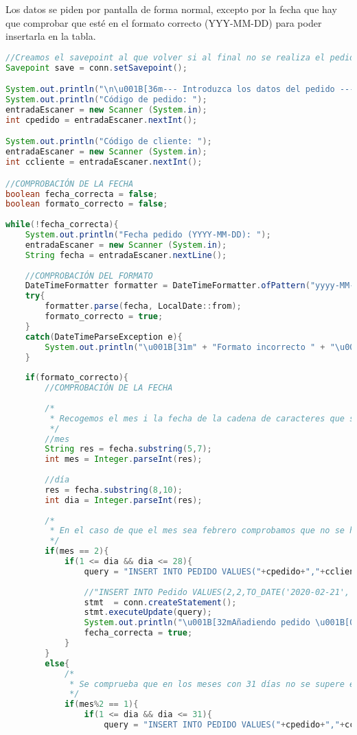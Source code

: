 Los datos se piden por pantalla de forma normal, excepto por la fecha que hay que comprobar que esté en el formato correcto (YYY-MM-DD) para poder insertarla en la tabla.

\begin{lstlisting}[language=Java]
//Creamos el savepoint al que volver si al final no se realiza el pedido
Savepoint save = conn.setSavepoint();

System.out.println("\n\u001B[36m--- Introduzca los datos del pedido ---\u001B[0m");
System.out.println("Código de pedido: ");
entradaEscaner = new Scanner (System.in);
int cpedido = entradaEscaner.nextInt();

System.out.println("Código de cliente: ");
entradaEscaner = new Scanner (System.in);
int ccliente = entradaEscaner.nextInt();

//COMPROBACIÓN DE LA FECHA	
boolean fecha_correcta = false;
boolean formato_correcto = false;
  								
while(!fecha_correcta){
	System.out.println("Fecha pedido (YYYY-MM-DD): ");
	entradaEscaner = new Scanner (System.in);
	String fecha = entradaEscaner.nextLine();
				  	
	//COMPROBACIÓN DEL FORMATO
	DateTimeFormatter formatter = DateTimeFormatter.ofPattern("yyyy-MM-dd");
	try{
		formatter.parse(fecha, LocalDate::from);
		formato_correcto = true;
	}
	catch(DateTimeParseException e){
		System.out.println("\u001B[31m" + "Formato incorrecto " + "\u001B[0m");
	}
	  	
	if(formato_correcto){
	  	//COMPROBACIÓN DE LA FECHA
	  	
	  	/*
	  	 * Recogemos el mes i la fecha de la cadena de caracteres que se ha pasado para ver si son correctos
	  	 */
	  	//mes
	  	String res = fecha.substring(5,7);
	  	int mes = Integer.parseInt(res);
									  	
	  	//día
		res = fecha.substring(8,10);
	  	int dia = Integer.parseInt(res);
									  	
		/*
		 * En el caso de que el mes sea febrero comprobamos que no se haya introducido un día mas allá del 28
		 */
	  	if(mes == 2){
	  		if(1 <= dia && dia <= 28){
				query = "INSERT INTO PEDIDO VALUES("+cpedido+","+ccliente + ",TO_DATE('"+fecha+"','YYYY-MM-DD'))";
		
				//"INSERT INTO Pedido VALUES(2,2,TO_DATE('2020-02-21','YYYY-MM-DD'))";
				stmt  = conn.createStatement();
				stmt.executeUpdate(query);
				System.out.println("\u001B[32mAñadiendo pedido \u001B[0m");
				fecha_correcta = true;
			}
		} 
		else{
			/*
			 * Se comprueba que en los meses con 31 días no se supere ese número
			 */
			if(mes%2 == 1){
				if(1 <= dia && dia <= 31){
					query = "INSERT INTO PEDIDO VALUES("+cpedido+","+ccliente + ",TO_DATE('"+fecha+"','YYYY-MM-DD'))";
									  				

\end{lstlisting}
